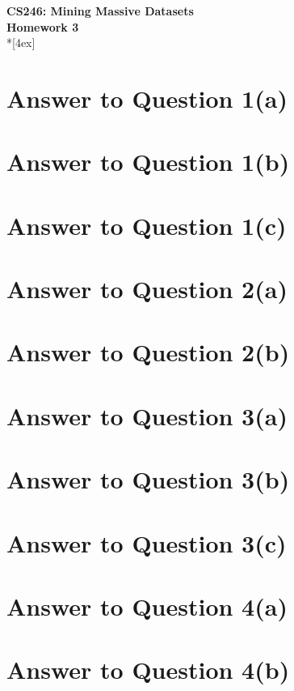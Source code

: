 \documentclass[11pt]{article}
\begin{document}
\thispagestyle{empty}
\parindent 0pt
\vfill
\large

\begin{center}
\LARGE{\bf \textsf{CS246: Mining Massive Datasets}}\\ {\bf \textsf{Homework 3}} 
\\*[4ex]
\end{center}

\section*{Answer to Question 1(a)}

\pagebreak[4]
\section*{Answer to Question 1(b)}

\pagebreak[4]
\section*{Answer to Question 1(c)}

\pagebreak[4]
\section*{Answer to Question 2(a)}

\pagebreak[4]
\section*{Answer to Question 2(b)}

\pagebreak[4]
\section*{Answer to Question 3(a)}

\pagebreak[4]
\section*{Answer to Question 3(b)}

\pagebreak[4]
\section*{Answer to Question 3(c)}

\pagebreak[4]
\section*{Answer to Question 4(a)}

\pagebreak[4]
\section*{Answer to Question 4(b)}

\pagebreak[4]
\end{document}
